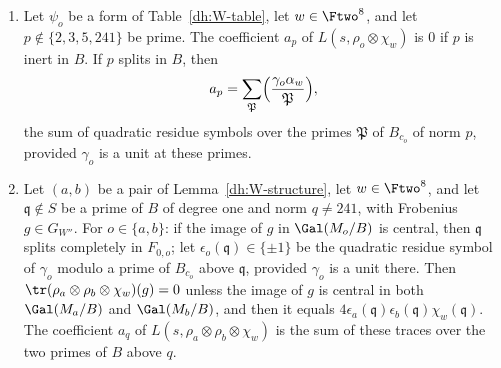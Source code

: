 \begin{lemma}\label{lv:coefficients}
\begin{enumerate}
\item[(a)] Let $\psi_o$ be a form of Table~\ref{dh:W-table}, let
 $w\in\Ftwo^8$, and let $p\notin\{2,3,5,241\}$ be prime. The coefficient
 $a_p$ of $L(s,\rho_o\otimes\chi_w)$ is $0$ if $p$ is inert in $B$. If $p$
 splits in $B$, then
 \[
  a_p=\sum_{\mathfrak P}\Bigl(\frac{\gamma_o\alpha_w}{\mathfrak P}\Bigr),
 \]
 the sum of quadratic residue symbols over the primes $\mathfrak P$ of
 $B_{c_o}$ of norm $p$, provided $\gamma_o$ is a unit at these primes.
\item[(b)] Let $(a,b)$ be a pair of Lemma~\ref{dh:W-structure}, let
 $w\in\Ftwo^8$, and let $\mathfrak q\notin S$ be a prime of $B$ of degree
 one and norm $q\ne241$, with Frobenius $g\in G_{W''}$. For $o\in\{a,b\}$: if
 the image of $g$ in $\Gal(M_o/B)$ is central, then $\mathfrak q$ splits completely in
 $F_{0,o}$; let $\epsilon_o(\mathfrak q)\in\{\pm1\}$ be the quadratic residue
 symbol of $\gamma_o$ modulo a prime of $B_{c_o}$ above $\mathfrak q$,
 provided $\gamma_o$ is a unit there. Then
 $\tr(\rho_a\otimes\rho_b\otimes\chi_w)(g)=0$ unless the image of $g$ is
 central in both $\Gal(M_a/B)$ and $\Gal(M_b/B)$, and then it equals
 $4\epsilon_a(\mathfrak q)\epsilon_b(\mathfrak q)\chi_w(\mathfrak q)$. The
 coefficient $a_q$ of $L(s,\rho_a\otimes\rho_b\otimes\chi_w)$ is the sum of
 these traces over the two primes of $B$ above $q$.
\end{enumerate}
\end{lemma}

